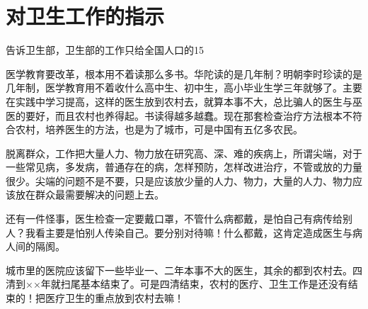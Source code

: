 \section[对卫生工作的指示（一九六五年六月二十六日）]{对卫生工作的指示}


告诉卫生部，卫生部的工作只给全国人口的15%

医学教育要改革，根本用不着读那么多书。华陀读的是几年制？明朝李时珍读的是几年制，医学教育用不着收什么高中生、初中生，高小毕业生学三年就够了。主要在实践中学习提高，这样的医生放到农村去，就算本事不大，总比骗人的医生与巫医的要好，而且农村也养得起。书读得越多越蠢。现在那套检查治疗方法根本不符合农村，培养医生的方法，也是为了城市，可是中国有五亿多农民。

脱离群众，工作把大量人力、物力放在研究高、深、难的疾病上，所谓尖端，对于一些常见病，多发病，普通存在的病，怎样预防，怎样改进治疗，不管或放的力量很少。尖端的问题不是不要，只是应该放少量的人力、物力，大量的人力、物力应该放在群众最需要解决的问题上去。

还有一件怪事，医生检查一定要戴口罩，不管什么病都戴，是怕自己有病传给别人？我看主要是怕别人传染自己。要分别对待嘛！什么都戴，这肯定造成医生与病人间的隔阂。

城市里的医院应该留下一些毕业一、二年本事不大的医生，其余的都到农村去。四清到××年就扫尾基本结束了。可是四清结束，农村的医疗、卫生工作是还没有结束的！把医疗卫生的重点放到农村去嘛！


